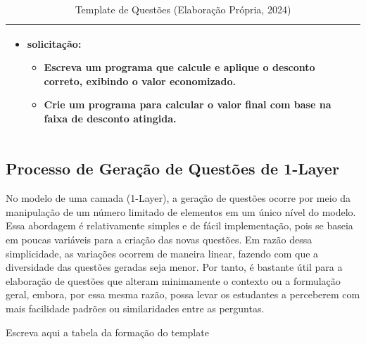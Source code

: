 \begin{table}[htbp]
\begin{tabular}{|l|p{10cm}|}
\begin{itemize}[leftmargin=1em]
  \item \textbf{solicitação}:
    \begin{itemize}[leftmargin=1em]
      \item Escreva um programa que calcule e aplique o desconto correto, exibindo o valor economizado.
      \item Crie um programa para calcular o valor final com base na faixa de desconto atingida.
    \end{itemize}
\end{itemize}\\
\hline

\end{tabular}
\caption{Template de Questões (Elaboração Própria, 2024)}
\label{tab:template-questoes-elementos}
\end{table}




\subsection{Processo de Geração de Questões de 1-Layer}

No modelo de uma camada (1-Layer), a geração de questões ocorre por meio da manipulação de um número limitado de elementos em um único nível do modelo. Essa abordagem é relativamente simples e de fácil implementação, pois se baseia em poucas variáveis para a criação das novas questões. Em razão dessa simplicidade, as variações ocorrem de maneira linear, fazendo com que a diversidade das questões geradas seja menor. Por tanto, é bastante útil para a elaboração de questões que alteram minimamente o contexto ou a formulação geral, embora, por essa mesma razão, possa levar os estudantes a perceberem com mais facilidade padrões ou similaridades entre as perguntas.

Escreva aqui a tabela da formação do template


